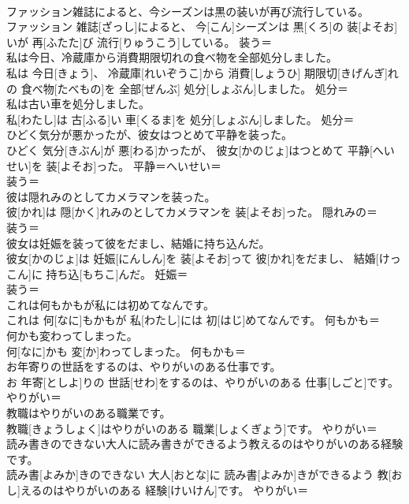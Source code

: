 \documentclass[8pt]{extreport}
\begin{document}
\begin{CJK}{UTF8}{min}
\\	ファッション雑誌によると、今シーズンは黒の装いが再び流行している。	
\\	ファッション 雑誌[ざっし]によると、 今[こん]シーズンは 黒[くろ]の 装[よそお]いが 再[ふたた]び 流行[りゅうこう]している。	装う＝ 
\\	私は今日、冷蔵庫から消費期限切れの食べ物を全部処分しました。	
\\	私は 今日[きょう]、 冷蔵庫[れいぞうこ]から 消費[しょうひ] 期限切[きげんぎ]れの 食べ物[たべもの]を 全部[ぜんぶ] 処分[しょぶん]しました。	処分＝ 
\\	私は古い車を処分しました。	
\\	私[わたし]は 古[ふる]い 車[くるま]を 処分[しょぶん]しました。	処分＝ 
\\	ひどく気分が悪かったが、彼女はつとめて平静を装った。	
\\	ひどく 気分[きぶん]が 悪[わる]かったが、 彼女[かのじょ]はつとめて 平静[へいせい]を 装[よそお]った。	平静＝へいせい＝ 
\\	装う＝ 
\\	彼は隠れみのとしてカメラマンを装った。	
\\	彼[かれ]は 隠[かく]れみのとしてカメラマンを 装[よそお]った。	隠れみの＝ 
\\	装う＝ 
\\	彼女は妊娠を装って彼をだまし、結婚に持ち込んだ。	
\\	彼女[かのじょ]は 妊娠[にんしん]を 装[よそお]って 彼[かれ]をだまし、 結婚[けっこん]に 持ち込[もちこ]んだ。	妊娠＝ 
\\	装う＝ 
\\	これは何もかもが私には初めてなんです。	
\\	これは 何[なに]もかもが 私[わたし]には 初[はじ]めてなんです。	何もかも＝ 
\\	何かも変わってしまった。	
\\	何[なに]かも 変[か]わってしまった。	何もかも＝ 
\\	お年寄りの世話をするのは、やりがいのある仕事です。	
\\	お 年寄[としよ]りの 世話[せわ]をするのは、やりがいのある 仕事[しごと]です。	やりがい＝ 
\\	教職はやりがいのある職業です。	
\\	教職[きょうしょく]はやりがいのある 職業[しょくぎょう]です。	やりがい＝ 
\\	読み書きのできない大人に読み書きができるよう教えるのはやりがいのある経験です。	
\\	読み書[よみか]きのできない 大人[おとな]に 読み書[よみか]きができるよう 教[おし]えるのはやりがいのある 経験[けいけん]です。	やりがい＝ 

\end{CJK}
\end{document}
